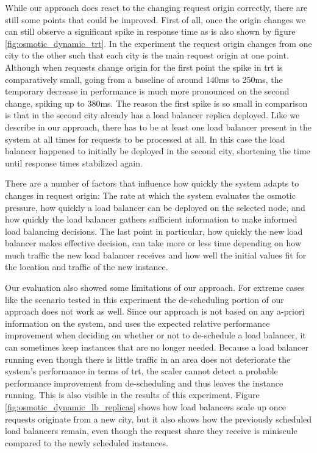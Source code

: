 \documentclass[draft,final]{vutinfth} %
\begin{document}
While our approach does react to the changing request origin correctly, there are still some points that could be improved.
First of all, once the origin changes we can still observe a significant spike in response time as is also shown by figure \ref{fig:osmotic_dynamic_trt}.
In the experiment the request origin changes from one city to the other such that each city is the main request origin at one point.
Although when requests change origin for the first point the spike in \gls{trt} is comparatively small, going from a baseline of around 140ms to 250ms, the temporary decrease in performance is much more pronounced on the second change, spiking up to 380ms.
The reason the first spike is so small in comparison is that in the second city already has a load balancer replica deployed.
Like we describe in our approach, there has to be at least one load balancer present in the system at all times for requests to be processed at all. 
In this case the load balancer happened to initially be deployed in the second city, shortening the time until response times stabilized again.

There are a number of factors that influence how quickly the system adapts to changes in request origin: The rate at which the system evaluates the osmotic pressure, how quickly a load balancer can be deployed on the selected node, and how quickly the load balancer gathers sufficient information to make informed load balancing decisions.
The last point in particular, how quickly the new load balancer makes effective decision, can take more or less time depending on how much traffic the new load balancer receives and how well the initial values fit for the location and traffic of the new instance.

Our evaluation also showed some limitations of our approach.
For extreme cases like the scenario tested in this experiment the de-scheduling portion of our approach does not work as well.
Since our approach is not based on any a-priori information on the system, and uses the expected relative performance improvement when deciding on whether or not to de-schedule a load balancer, it can sometimes keep instances that are no longer needed.
Because a load balancer running even though there is little traffic in an area does not deteriorate the system's performance in terms of \gls{trt}, the scaler cannot detect a probable performance improvement from de-scheduling and thus leaves the instance running. 
This is also visible in the results of this experiment.
Figure \ref{fig:osmotic_dynamic_lb_replicas} shows how load balancers scale up once requests originate from a new city, but it also shows how the previously scheduled load balancers remain, even though the request share they receive is miniscule compared to the newly scheduled instances.
\end{document}
